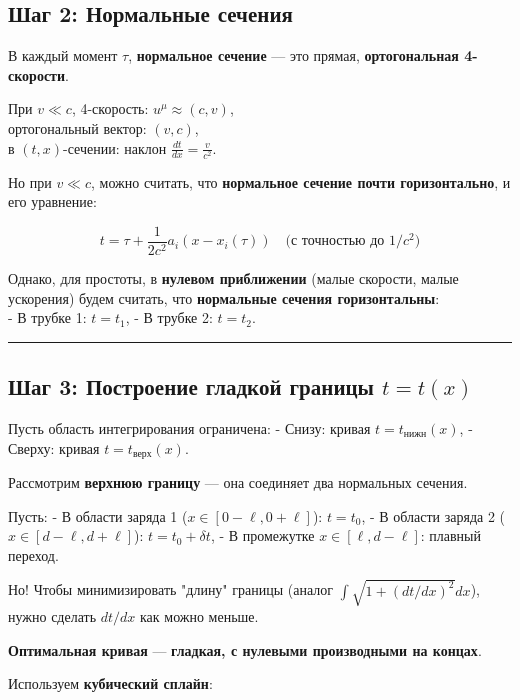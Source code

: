 \documentclass[11pt]{article}
\begin{document}
\subsection{Шаг 2: Нормальные сечения}

В каждый момент \(\tau\), \textbf{нормальное сечение} --- это прямая,
\textbf{ортогональная 4-скорости}.

При \(v \ll c\), 4-скорость: \(u^\mu \approx (c, v)\),\\
ортогональный вектор: \((v, c)\),\\
в \((t,x)\)-сечении: наклон \(\frac{dt}{dx} = \frac{v}{c^2}\).

Но при \(v \ll c\), можно считать, что \textbf{нормальное сечение почти
горизонтально}, и его уравнение:

\[
t = \tau + \frac{1}{2c^2} a_i (x - x_i(\tau)) \quad \text{(с точностью до } 1/c^2\text{)}
\]

Однако, для простоты, в \textbf{нулевом приближении} (малые скорости,
малые ускорения) будем считать, что \textbf{нормальные сечения
горизонтальны}:\\
- В трубке 1: \(t = t_1\), - В трубке 2: \(t = t_2\).

\begin{center}\rule{0.5\linewidth}{\linethickness}\end{center}

\subsection{\texorpdfstring{ Шаг 3: Построение гладкой границы
\(t = t(x)\)}{ Шаг 3: Построение гладкой границы t = t(x)}}

Пусть область интегрирования ограничена: - Снизу: кривая
\(t = t_{\text{нижн}}(x)\), - Сверху: кривая \(t = t_{\text{верх}}(x)\).

Рассмотрим \textbf{верхнюю границу} --- она соединяет два нормальных
сечения.

Пусть: - В области заряда 1 (\(x \in [0 - \ell, 0 + \ell]\)):
\(t = t_0\), - В области заряда 2 (\(x \in [d - \ell, d + \ell]\)):
\(t = t_0 + \delta t\), - В промежутке \(x \in [\ell, d - \ell]\):
плавный переход.

Но! Чтобы минимизировать "длину" границы (аналог
\(\int \sqrt{1 + (dt/dx)^2} dx\)), нужно сделать \(dt/dx\) как можно
меньше.

 \textbf{Оптимальная кривая} --- \textbf{гладкая, с нулевыми
производными на концах}.

Используем \textbf{кубический сплайн}:
\end{document}
